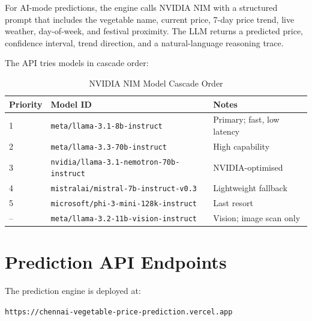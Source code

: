 \documentclass[12pt, a4paper, oneside]{report}
\begin{document}
For AI-mode predictions, the engine calls NVIDIA NIM with a structured prompt
that includes the vegetable name, current price, 7-day price trend, live
weather, day-of-week, and festival proximity. The LLM returns a predicted price,
confidence interval, trend direction, and a natural-language reasoning trace.

The API tries models in cascade order:

\begin{table}[H]
\centering
\caption{NVIDIA NIM Model Cascade Order}
\label{tab:nim}
\begin{tabularx}{\textwidth}{@{} C{1.2cm} L{7.2cm} X @{}}
\toprule
\textbf{Priority} & \textbf{Model ID} & \textbf{Notes} \\
 & \texttt{meta/llama-3.1-8b-instruct}            & Primary; fast, low latency \\
2 & \texttt{meta/llama-3.3-70b-instruct}            & High capability \\
3 & \texttt{nvidia/llama-3.1-nemotron-70b-instruct} & NVIDIA-optimised \\
4 & \texttt{mistralai/mistral-7b-instruct-v0.3}     & Lightweight fallback \\
5 & \texttt{microsoft/phi-3-mini-128k-instruct}     & Last resort \\
-- & \texttt{meta/llama-3.2-11b-vision-instruct}   & Vision; image scan only \\
\bottomrule
\end{tabularx}
\end{table}

\section{Prediction API Endpoints}

The prediction engine is deployed at:

\begin{center}
\texttt{https://chennai-vegetable-price-prediction.vercel.app}
\end{center}
\end{document}
